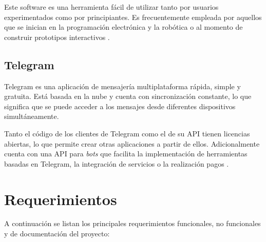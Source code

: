 Este software es una herramienta fácil de utilizar tanto por usuarios experimentados como por principiantes. Es frecuentemente empleada por aquellos que se inician en la programación electrónica y la robótica o al momento de construir prototipos interactivos \citep{arduinoide:2}. 

\subsection{Telegram}
\label{sec:Telegram}

Telegram es una aplicación de mensajería multiplataforma rápida, simple y gratuita. Está basada en la nube y cuenta con sincronización constante, lo que significa que se puede acceder a los mensajes desde diferentes dispositivos simultáneamente. 

Tanto el código de los clientes de Telegram como el de su API tienen licencias abiertas, lo que permite crear otras aplicaciones a partir de ellos. Adicionalmente cuenta con una API para \textit{bots} que facilita la implementación de herramientas basadas en Telegram, la integración de servicios o la realización pagos \citep{telegram}.
 
  

\section{Requerimientos}
\label{sec:Requerimientos}

A continuación se listan los principales requerimientos funcionales,  no funcionales y de documentación del proyecto:

